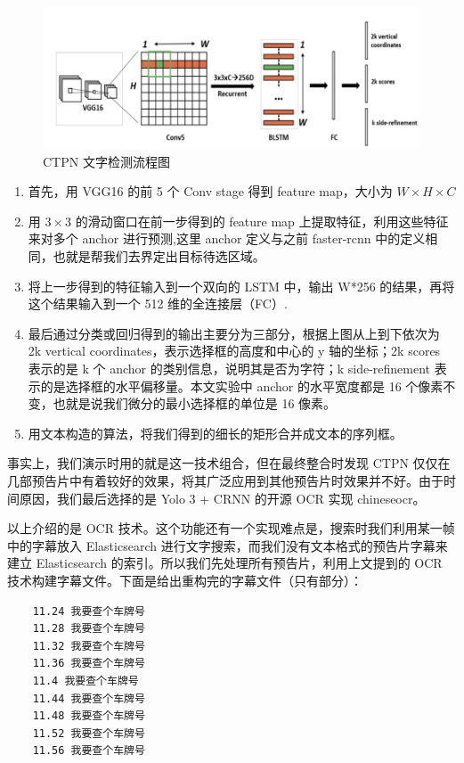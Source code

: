 \documentclass[main.tex]{subfiles}
\begin{document}
\begin{figure}[h]
    \includegraphics[width=\linewidth]{images/ctpn_pipeline.jpg}
    \caption{CTPN 文字检测流程图 \cite{tian2016detecting}}
    \label{fig:ctpn-pipeline}
\end{figure}

\begin{enumerate}
    \item 首先，用 VGG16 的前 5 个 Conv stage 得到 feature map，大小为 $W \times H \times C$
    \item 用 $3 \times 3$ 的滑动窗口在前一步得到的 feature map 上提取特征，利用这些特征来对多个 anchor 进行预测,这里 anchor 定义与之前 faster-rcnn 中的定义相同，也就是帮我们去界定出目标待选区域。
    \item 将上一步得到的特征输入到一个双向的 LSTM 中，输出 W*256 的结果，再将这个结果输入到一个 512 维的全连接层（FC）.
    \item 最后通过分类或回归得到的输出主要分为三部分，根据上图从上到下依次为 2k vertical coordinates，表示选择框的高度和中心的 y 轴的坐标；2k scores 表示的是 k 个 anchor 的类别信息，说明其是否为字符；k side-refinement 表示的是选择框的水平偏移量。本文实验中 anchor 的水平宽度都是 16 个像素不变，也就是说我们微分的最小选择框的单位是 16 像素。    
    \item 用文本构造的算法，将我们得到的细长的矩形合并成文本的序列框。
\end{enumerate}

事实上，我们演示时用的就是这一技术组合，但在最终整合时发现 CTPN 仅仅在几部预告片中有着较好的效果，将其广泛应用到其他预告片时效果并不好。由于时间原因，我们最后选择的是 Yolo 3 + CRNN 的开源 OCR 实现 chineseocr。

以上介绍的是 OCR 技术。这个功能还有一个实现难点是，搜索时我们利用某一帧中的字幕放入 Elasticsearch 进行文字搜索，而我们没有文本格式的预告片字幕来建立 Elasticsearch 的索引。所以我们先处理所有预告片，利用上文提到的 OCR 技术构建字幕文件。下面是给出重构完的字幕文件（只有部分）：

\begin{verbatim}
    11.24 我要查个车牌号
    11.28 我要查个车牌号
    11.32 我要查个车牌号
    11.36 我要查个车牌号
    11.4 我要查个车牌号
    11.44 我要查个车牌号
    11.48 我要查个车牌号
    11.52 我要查个车牌号
    11.56 我要查个车牌号
\end{verbatim}
\end{document}
